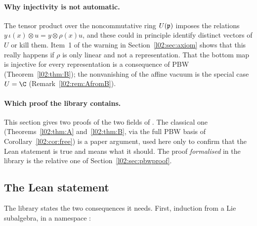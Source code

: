 \paragraph{Why injectivity is not automatic.} The tensor product over the noncommutative ring
$U(\mathfrak{p})$ imposes the relations $y\,\iota(x)\otimes u = y\otimes\rho(x)u$, and these could in principle
identify distinct vectors of $U$ or kill them. Item~1 of the warning in
Section~\ref{l02:sec:axiom} shows that this really happens if $\rho$ is only linear and not a
representation. That the bottom map is injective for every representation is a consequence of PBW
(Theorem~\ref{l02:thm:B}); the nonvanishing of the affine vacuum is the special case $U = \C$
(Remark~\ref{l02:rem:AfromB}).

\paragraph{Which proof the library contains.} This section gives two proofs of the two fields of
. The classical one (Theorems~\ref{l02:thm:A} and~\ref{l02:thm:B}, via the full PBW basis of
Corollary~\ref{l02:cor:free}) is a paper argument, used here only to confirm that the Lean statement is
true and means what it should. The proof \emph{formalised} in the library is the relative one of
Section~\ref{l02:sec:pbwproof}.

\subsection{The Lean statement}

The library states the two consequences it needs. First, induction from a Lie subalgebra, in a
namespace :

